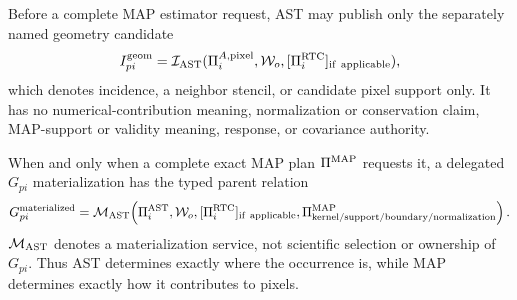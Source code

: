 Before a complete MAP estimator request, AST may publish only the separately
named geometry candidate
\begin{equation}
 I^{\rm geom}_{pi}=
 \mathcal I_{\rm AST}(\Pi^{A,{\rm pixel}}_i,\mathcal W_o,
 [\Pi^{\rm RTC}_{i}]_{\rm if\ applicable}),
 \label{eq:geometry-incidence}
\end{equation}
which denotes incidence, a neighbor stencil, or candidate pixel support only.
It has no numerical-contribution meaning, normalization or conservation
claim, MAP-support or validity meaning, response, or covariance authority.

When and only when a complete exact MAP plan $\Pi^{\rm MAP}$ requests it, a
delegated $G_{pi}$ materialization has the typed parent relation
\begin{equation}
 G_{pi}^{\rm materialized}=
 \mathcal M_{\rm AST}\!\left(
   \Pi^{\rm AST}_{i},\mathcal W_o,
   [\Pi^{\rm RTC}_{i}]_{\rm if\ applicable},
   \Pi^{\rm MAP}_{\rm kernel/support/boundary/normalization}
 \right).
 \label{eq:gpi-parentage}
\end{equation}
$\mathcal M_{\rm AST}$ denotes a materialization service, not scientific
selection or ownership of $G_{pi}$.  Thus AST determines exactly where the
occurrence is, while MAP determines exactly how it contributes to pixels.
